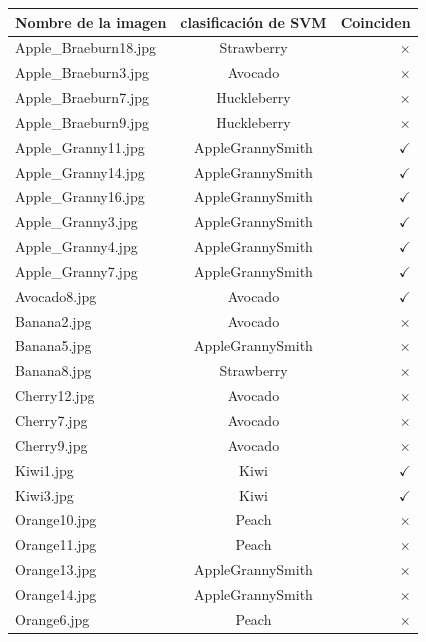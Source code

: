 \documentclass[paper=letter, fontsize=11pt]{scrartcl}
\numberwithin{equation}{section} %
\numberwithin{figure}{section} %
\numberwithin{table}{section} %
\begin{document}
\begin{minipage}{\linewidth}
\centering
\begin{tabular}{l|c|r}\hline
   Nombre de la imagen & clasificación de SVM & Coinciden\\ \hline
   Apple\_Braeburn18.jpg &      Strawberry&  $\times$\\
   Apple\_Braeburn3.jpg  &        Avocado& $\times$ \\
   Apple\_Braeburn7.jpg   &   Huckleberry& $\times$ \\ 
   Apple\_Braeburn9.jpg &     Huckleberry& $\times$\\
    Apple\_Granny11.jpg & AppleGrannySmith& $\checkmark$\\
    Apple\_Granny14.jpg & AppleGrannySmith& $\checkmark$\\
    Apple\_Granny16.jpg & AppleGrannySmith& $\checkmark$\\
     Apple\_Granny3.jpg & AppleGrannySmith& $\checkmark$\\
     Apple\_Granny4.jpg & AppleGrannySmith& $\checkmark$\\
    Apple\_Granny7.jpg  & AppleGrannySmith& $\checkmark$\\
         Avocado8.jpg  &        Avocado& $\checkmark$\\
          Banana2.jpg  &        Avocado& $\times$\\
          Banana5.jpg  & AppleGrannySmith& $\times$\\
          Banana8.jpg  &     Strawberry& $\times$\\
         Cherry12.jpg  &        Avocado& $\times$\\
          Cherry7.jpg  &        Avocado& $\times$\\
          Cherry9.jpg  &        Avocado& $\times$\\
            Kiwi1.jpg  &           Kiwi& $\checkmark$ \\
           Kiwi3.jpg   &          Kiwi& $\checkmark$\\
         Orange10.jpg  &          Peach& $\times$\\
         Orange11.jpg  &          Peach& $\times$\\
         Orange13.jpg & AppleGrannySmith& $\times$\\
         Orange14.jpg & AppleGrannySmith& $\times$\\
          Orange6.jpg  &          Peach & $\times$\\
\end {tabular}
\label{resultados3} 
\end{minipage}
\FloatBarrier 
\end{document}
